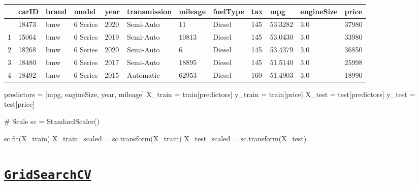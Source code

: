 \documentclass[
  letterpaper,
  DIV=11,
  numbers=noendperiod]{scrreprt}
\newenvironment{Shaded}{\begin{snugshade}}{\end{snugshade}}
\newcommand{\CommentTok}[1]{\textcolor[rgb]{0.37,0.37,0.37}{#1}}
\newcommand{\NormalTok}[1]{\textcolor[rgb]{0.00,0.23,0.31}{#1}}
\newcommand{\OperatorTok}[1]{\textcolor[rgb]{0.37,0.37,0.37}{#1}}
\newcommand{\StringTok}[1]{\textcolor[rgb]{0.13,0.47,0.30}{#1}}
\begin{document}
\begin{longtable}[]{@{}llllllllllll@{}}
\toprule\noalign{}
& carID & brand & model & year & transmission & mileage & fuelType & tax
& mpg & engineSize & price \\
\midrule\noalign{}
\endhead
\bottomrule\noalign{}
\endlastfoot
0 & 18473 & bmw & 6 Series & 2020 & Semi-Auto & 11 & Diesel & 145 &
53.3282 & 3.0 & 37980 \\
1 & 15064 & bmw & 6 Series & 2019 & Semi-Auto & 10813 & Diesel & 145 &
53.0430 & 3.0 & 33980 \\
2 & 18268 & bmw & 6 Series & 2020 & Semi-Auto & 6 & Diesel & 145 &
53.4379 & 3.0 & 36850 \\
3 & 18480 & bmw & 6 Series & 2017 & Semi-Auto & 18895 & Diesel & 145 &
51.5140 & 3.0 & 25998 \\
4 & 18492 & bmw & 6 Series & 2015 & Automatic & 62953 & Diesel & 160 &
51.4903 & 3.0 & 18990 \\
\end{longtable}

\begin{Shaded}
\begin{Highlighting}[]
\NormalTok{predictors }\OperatorTok{=}\NormalTok{ [}\StringTok{\textquotesingle{}mpg\textquotesingle{}}\NormalTok{, }\StringTok{\textquotesingle{}engineSize\textquotesingle{}}\NormalTok{, }\StringTok{\textquotesingle{}year\textquotesingle{}}\NormalTok{, }\StringTok{\textquotesingle{}mileage\textquotesingle{}}\NormalTok{]}
\NormalTok{X\_train }\OperatorTok{=}\NormalTok{ train[predictors]}
\NormalTok{y\_train }\OperatorTok{=}\NormalTok{ train[}\StringTok{\textquotesingle{}price\textquotesingle{}}\NormalTok{]}
\NormalTok{X\_test }\OperatorTok{=}\NormalTok{ test[predictors]}
\NormalTok{y\_test }\OperatorTok{=}\NormalTok{ test[}\StringTok{\textquotesingle{}price\textquotesingle{}}\NormalTok{]}

\CommentTok{\# Scale}
\NormalTok{sc }\OperatorTok{=}\NormalTok{ StandardScaler()}

\NormalTok{sc.fit(X\_train)}
\NormalTok{X\_train\_scaled }\OperatorTok{=}\NormalTok{ sc.transform(X\_train)}
\NormalTok{X\_test\_scaled }\OperatorTok{=}\NormalTok{ sc.transform(X\_test)}
\end{Highlighting}
\end{Shaded}

\section{\texorpdfstring{\href{https://scikit-learn.org/stable/modules/generated/sklearn.model_selection.GridSearchCV.html}{\texttt{GridSearchCV}}}{GridSearchCV}}\label{gridsearchcv}
\end{document}
